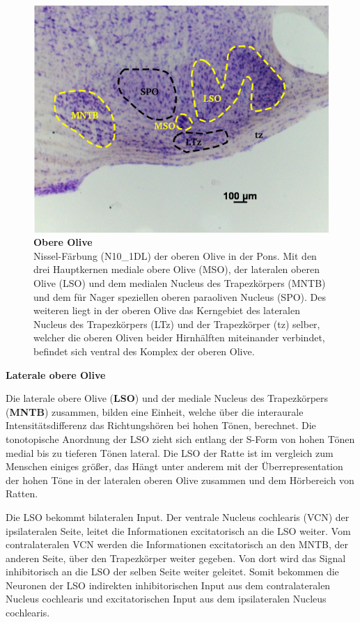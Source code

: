 \documentclass[12pt,a4paper,pdftex]{article}
\begin{document}
\begin{figure}[H]
    \centering
    \includegraphics{pictures/auditory/obere_olive.png}
    \caption[Obere Olive]{\textbf{Obere Olive}\\
    Nissel-Färbung (N10\_1DL) der oberen Olive in der Pons. Mit den drei Hauptkernen mediale obere Olive (MSO), der lateralen oberen Olive (LSO) und dem medialen Nucleus des Trapezkörpers (MNTB) und dem für Nager speziellen oberen paraoliven Nucleus (SPO). Des weiteren liegt in der oberen Olive das Kerngebiet des lateralen Nucleus des Trapezkörpers (LTz) und der Trapezkörper (tz) selber, welcher die oberen Oliven beider Hirnhälften miteinander verbindet, befindet sich ventral des Komplex der oberen Olive.}
    \label{fig:obere_Olive}
\end{figure}

\newpage
\textbf{Laterale obere Olive}

\noindent Die laterale obere Olive (\textbf{LSO}) und der mediale Nucleus des Trapezkörpers (\textbf{MNTB}) zusammen, bilden eine Einheit, welche über die interaurale Intensitätsdifferenz das Richtungshören bei hohen Tönen, berechnet. 
 Die tonotopische Anordnung der LSO zieht sich entlang der S-Form von hohen Tönen medial bis zu tieferen Tönen lateral. Die LSO der Ratte ist im vergleich zum Menschen einiges größer, das Hängt unter anderem mit der Überrepresentation der hohen Töne in der lateralen oberen Olive zusammen und dem Hörbereich von Ratten.

Die LSO bekommt bilateralen Input. Der ventrale Nucleus cochlearis (VCN) der ipsilateralen Seite, leitet die Informationen excitatorisch an die LSO weiter. Vom contralateralen VCN werden die Informationen excitatorisch an den MNTB, der anderen Seite, über den Trapezkörper weiter gegeben. Von dort wird das Signal inhibitorisch an die LSO der selben Seite weiter geleitet.
Somit bekommen die Neuronen der LSO indirekten inhibitorischen Input aus dem contralateralen Nucleus cochlearis und excitatorischen Input aus dem ipsilateralen Nucleus cochlearis.
\end{document}
